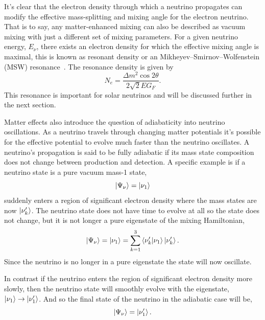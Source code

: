 It's clear that the electron density through which a
neutrino propagates can modify the effective mass-splitting and mixing angle
for the electron neutrino.
That is to say, any matter-enhanced mixing can also be described as vacuum mixing
with just a different set of mixing parameters.
For a given neutrino energy, $E_{\nu}$, there exists an electron density for which
the effective mixing angle is maximal, this is known as resonant density or
an Mikheyev–Smirnov–Wolfenstein (MSW) resonance~\citep{wolfenstein_osc, ms_oscillation}.
The resonance density is given by
\begin{equation}
    N_{e} = \frac{\Delta m^{2} \cos2\theta}{2\sqrt{2}EG_{F}}\text{.}
    \label{eqn:msw_resonance}
\end{equation}
This resonance is important for solar neutrinos and will be discussed further in
the next section.

Matter effects also introduce the question of adiabaticity into neutrino
oscillations.
As a neutrino travels through changing matter potentials it's possible for
the effective potential to evolve much faster than the neutrino oscillates.
A neutrino's propagation is said to be fully adiabatic if its mass state composition
does not change between production and detection.
A specific example is if a neutrino state is a pure vacuum mass-1
state,
\begin{equation*}
    \ket{\Psi_{\nu}} = \ket{\nu_{1}}
\end{equation*}
suddenly enters a region of significant electron density where the mass states
are now $\ket{\nu_{k}^\prime}$.
The neutrino state does not have time to evolve at all so the state
does not change, but it is not longer a pure eigenstate of the mixing
Hamiltonian,
\begin{equation*}
    \ket{\Psi_{\nu}} = \ket{\nu_{1}} = \sum_{k=1}^{3} \braket{\nu_{k}^\prime}{\nu_{1}}\ket{\nu_{k}^\prime}\text{.}
\end{equation*}
Since the neutrino is no longer in a pure eigenstate the state will
now oscillate.

In contrast if the neutrino enters the region of significant electron
density more slowly, then the neutrino state will smoothly evolve with the
eigenstate, $\ket{\nu_{1}} \rightarrow \ket{\nu_{1}^{\prime}}$.
And so the final state of the neutrino in the adiabatic case will be,
\begin{equation*}
    \ket{\Psi_{\nu}} = \ket{\nu_{1}^{\prime}}\text{.}
\end{equation*}

